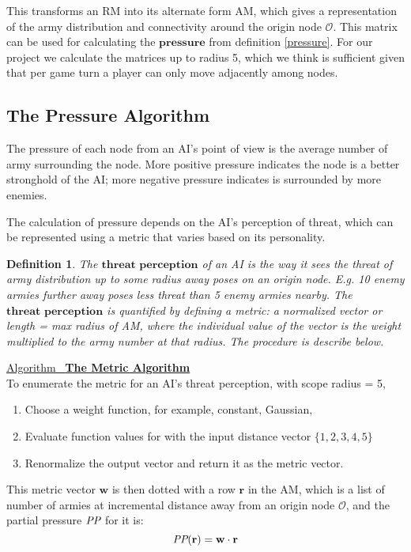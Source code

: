 \documentclass[12pt]{article}  %
\newtheorem{definition}{Definition}
\newcommand{\algtitle}[1]{\underline{Algorithm \ {\bf #1}} \vspace*{1mm}\\}
\begin{document}
This transforms an RM into its alternate form AM, which gives a representation of the army distribution and connectivity around the origin node $\mathcal{O}$. This matrix can be used for calculating the $\textbf{pressure}$ from definition \ref{pressure}. For our project we calculate the matrices up to radius 5, which we think is sufficient given that per game turn a player can only move adjacently among nodes.





\subsection{The Pressure Algorithm}

The pressure of each node from an AI's point of view is the average number of army surrounding the node. More positive pressure indicates the node is a better stronghold of the AI; more negative pressure indicates is surrounded by more enemies.

The calculation of pressure depends on the AI's perception of threat, which can be represented using a metric that varies based on its personality.

\begin{definition}
The $\textbf{threat perception}$ of an AI is the way it sees the threat of army distribution up to some radius away poses on an origin node. E.g. 10 enemy armies further away poses less threat than 5 enemy armies nearby. The $\textbf{threat perception}$ is quantified by defining a metric: a normalized vector or length = max radius of AM, where the individual value of the vector is the weight multiplied to the army number at that radius. The procedure is describe below.
\end{definition}

\algtitle{The Metric Algorithm}
To enumerate the metric for an AI's threat perception, with scope radius = 5,
\begin{enumerate}
	\item Choose a weight function, for example, constant, Gaussian,
	\item Evaluate function values for with the input distance vector $\{1,2,3,4,5\}$
	\item Renormalize the output vector and return it as the metric vector.
\end{enumerate}

This metric vector $\mathbf{w}$ is then dotted with a row $\mathbf{r}$ in the AM, which is a list of number of armies at incremental distance away from an origin node $\mathcal{O}$, and the partial pressure $\emph{PP}$ for it is:
$$\emph{PP}(\mathbf{r}) = \mathbf{w} \cdot \mathbf{r}$$
\end{document}
